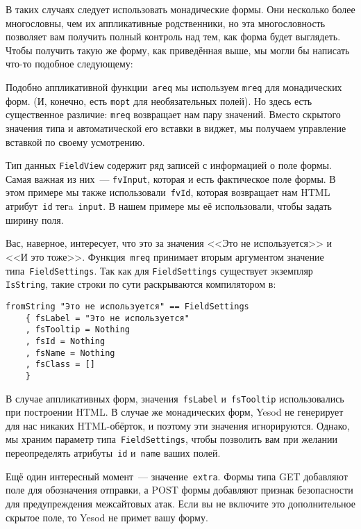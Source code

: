 В таких случаях следует использовать монадические формы. Они несколько более
многословны, чем их аппликативные родственники, но эта многословность
позволяет вам получить полный контроль над тем, как форма будет выглядеть.
Чтобы получить такую же форму, как приведённая выше, мы могли бы написать
что-то подобное следующему:

Подобно аппликативной функции~\lstinline'areq' мы используем \lstinline'mreq'
для монадических форм.  (И, конечно, есть \lstinline'mopt' для необязательных
полей).  Но здесь есть существенное различие: \lstinline'mreq' возвращает нам
пару значений.  Вместо скрытого значения типа
и автоматической его вставки в виджет, мы получаем управление вставкой по
своему усмотрению.

Тип данных \lstinline'FieldView' содержит ряд записей с информацией о поле
формы. Самая важная из них~--- \lstinline'fvInput', которая и есть фактическое
поле формы. В этом примере мы также использовали~\lstinline'fvId', которая
возвращает нам HTML атрибут~\texttt{id} тегa~\texttt{input}. В нашем примере
мы её использовали, чтобы задать ширину поля.

Вас, наверное, интересует, что это за значения <<Это не используется>> и <<И это
тоже>>.  Функция~\lstinline'mreq' принимает вторым аргументом значение
типа~\lstinline'FieldSettings'.  Так как для \lstinline'FieldSettings'
существует экземпляр \lstinline'IsString', такие строки по сути раскрываются
компилятором в:

\begin{lstlisting}
fromString "Это не используется" == FieldSettings
    { fsLabel = "Это не используется"
    , fsTooltip = Nothing
    , fsId = Nothing
    , fsName = Nothing
    , fsClass = []
    }
\end{lstlisting}

В случае аппликативных форм, значения~\lstinline'fsLabel'
и~\lstinline'fsTooltip' использовались при построении HTML. В случае же
монадических форм, Yesod не генерирует для нас никаких HTML-обёрток, и поэтому
эти значения игнорируются. Однако, мы храним параметр
типа~\lstinline'FieldSettings', чтобы позволить вам при желании переопределять
атрибуты~\texttt{id} и~\texttt{name} ваших полей.

Ещё один интересный момент~--- значение~\lstinline{extra}. Формы типа GET
добавляют поле для обозначения отправки, а POST формы добавляют признак
безопасности для предупреждения межсайтовых атак.  Если вы не включите это
дополнительное скрытое поле, то Yesod не примет вашу форму.

